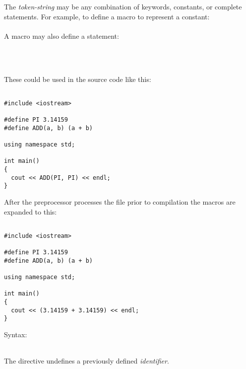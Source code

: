 The \textit{token-string} may be any combination of keywords, constants, or complete statements. For example, to define a macro to represent a constant:
~\\

~\\

A macro may also define a statement:

~\\


~\\

These could be used in the source code like this:

\noindent\begin{minipage}{\linewidth}\begin{lstlisting}

#include <iostream>

#define PI 3.14159
#define ADD(a, b) (a + b)

using namespace std;

int main()
{
  cout << ADD(PI, PI) << endl;
}

\end{lstlisting}\end{minipage}

After the preprocessor processes the file prior to compilation the macros are expanded to this:


\noindent\begin{minipage}{\linewidth}\begin{lstlisting}

#include <iostream>

#define PI 3.14159
#define ADD(a, b) (a + b)

using namespace std;

int main()
{
  cout << (3.14159 + 3.14159) << endl;
}

\end{lstlisting}\end{minipage}


Syntax:


~\\

The  directive undefines a previously defined \textit{identifier}.


